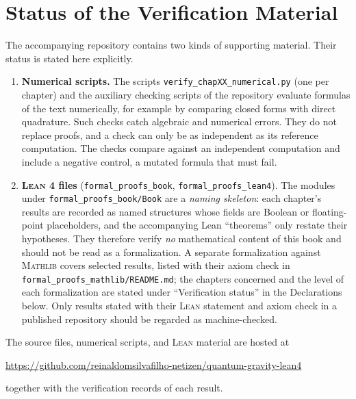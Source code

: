 \documentclass[11pt,a4paper,openright,twoside]{book}
\begin{document}
\section*{Status of the Verification Material}
The accompanying repository contains two kinds of supporting material. Their status is stated here explicitly.
{\sloppy
\begin{enumerate}
    \item \textbf{Numerical scripts.} The scripts \texttt{verify\_chapXX\_numerical.py} (one per chapter) and the auxiliary checking scripts of the repository evaluate formulas of the text numerically, for example by comparing closed forms with direct quadrature. Such checks catch algebraic and numerical errors. They do not replace proofs, and a check can only be as independent as its reference computation. The checks compare against an independent computation and include a negative control, a mutated formula that must fail.
    \item \textbf{\textsc{Lean 4} files} (\texttt{formal\_proofs\_book}, \texttt{formal\_proofs\_lean4}). The modules under \texttt{formal\_proofs\_book/Book} are a \emph{naming skeleton}: each chapter's results are recorded as named structures whose fields are Boolean or floating-point placeholders, and the accompanying Lean ``theorems'' only restate their hypotheses. They therefore verify \emph{no} mathematical content of this book and should not be read as a formalization. A separate formalization against \textsc{Mathlib} covers selected results, listed with their axiom check in \texttt{formal\_proofs\_mathlib/README.md}; the chapters concerned and the level of each formalization are stated under ``Verification status'' in the Declarations below. Only results stated with their \textsc{Lean} statement and axiom check in a published repository should be regarded as machine-checked.
\end{enumerate}
\par}

{\sloppy
The source files, numerical scripts, and \textsc{Lean} material are hosted at
\begin{center}
\url{https://github.com/reinaldomsilvafilho-netizen/quantum-gravity-lean4}
\end{center}
together with the verification records of each result.
}

\newcommand{\gtqgdeclscope}{book}

\end{document}
